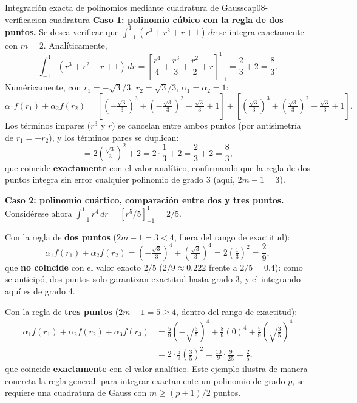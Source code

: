 \begin{ejemplo}{Integración exacta de polinomios mediante cuadratura de Gauss}{cap08-verificacion-cuadratura}
\textbf{Caso 1: polinomio cúbico con la regla de dos puntos.} Se desea verificar que $\int_{-1}^1 (r^3+r^2+r+1)\,dr$ se integra exactamente con $m=2$. Analíticamente,
\[
\int_{-1}^1 (r^3+r^2+r+1)\,dr = \left[\frac{r^4}{4}+\frac{r^3}{3}+\frac{r^2}{2}+r\right]_{-1}^{1} = \frac23 + 2 = \frac83 .
\]
Numéricamente, con $r_1=-\sqrt3/3$, $r_2=\sqrt3/3$, $\alpha_1=\alpha_2=1$:
\[
\alpha_1 f(r_1) + \alpha_2 f(r_2) = \left[\left(-\tfrac{\sqrt3}{3}\right)^3+\left(-\tfrac{\sqrt3}{3}\right)^2-\tfrac{\sqrt3}{3}+1\right] + \left[\left(\tfrac{\sqrt3}{3}\right)^3+\left(\tfrac{\sqrt3}{3}\right)^2+\tfrac{\sqrt3}{3}+1\right] .
\]
Los términos impares ($r^3$ y $r$) se cancelan entre ambos puntos (por antisimetría de $r_1=-r_2$), y los términos pares se duplican:
\[
= 2\left(\tfrac{\sqrt3}{3}\right)^2 + 2 = 2\cdot\frac13 + 2 = \frac23+2=\frac83 ,
\]
que coincide \textbf{exactamente} con el valor analítico, confirmando que la regla de dos puntos integra sin error cualquier polinomio de grado 3 (aquí, $2m-1=3$).

\textbf{Caso 2: polinomio cuártico, comparación entre dos y tres puntos.} Considérese ahora $\int_{-1}^1 r^4\,dr = \left[r^5/5\right]_{-1}^1 = 2/5$.

Con la regla de \textbf{dos puntos} ($2m-1=3<4$, fuera del rango de exactitud):
\[
\alpha_1 f(r_1)+\alpha_2 f(r_2) = \left(-\tfrac{\sqrt3}{3}\right)^4 + \left(\tfrac{\sqrt3}{3}\right)^4 = 2\left(\tfrac13\right)^2 = \frac29 ,
\]
que \textbf{no coincide} con el valor exacto $2/5$ ($2/9\approx0.222$ frente a $2/5=0.4$): como se anticipó, dos puntos solo garantizan exactitud hasta grado 3, y el integrando aquí es de grado 4.

Con la regla de \textbf{tres puntos} ($2m-1=5\geq4$, dentro del rango de exactitud):
\begin{align*}
\alpha_1 f(r_1)+\alpha_2 f(r_2)+\alpha_3 f(r_3) &= \frac59\left(-\sqrt{\tfrac35}\right)^4 + \frac89(0)^4 + \frac59\left(\sqrt{\tfrac35}\right)^4 \\
&= 2\cdot\frac59\left(\frac35\right)^2 = \frac{10}{9}\cdot\frac{9}{25} = \frac{2}{5} ,
\end{align*}
que coincide \textbf{exactamente} con el valor analítico. Este ejemplo ilustra de manera concreta la regla general: para integrar exactamente un polinomio de grado $p$, se requiere una cuadratura de Gauss con $m\geq (p+1)/2$ puntos.
\end{ejemplo}

